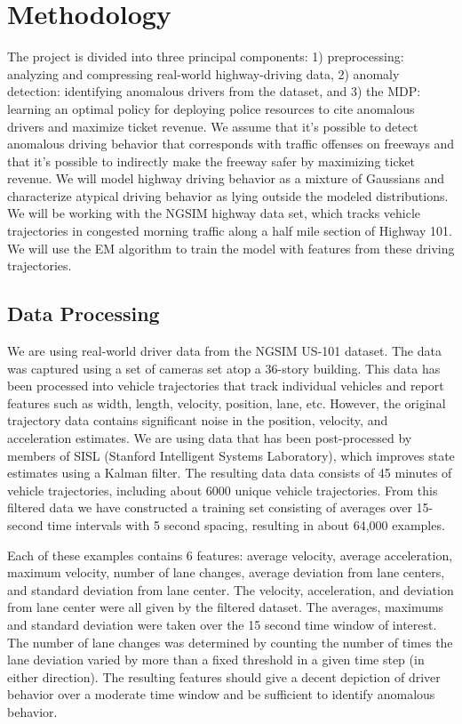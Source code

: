 \documentclass[10pt,journal]{IEEEtran}
\begin{document}
\section{Methodology}
The project is divided into three principal components: 1) preprocessing: analyzing and compressing real-world highway-driving data, 2) anomaly detection: identifying anomalous drivers from the dataset, and 3) the MDP: learning an optimal policy for deploying police resources to cite anomalous drivers and maximize ticket revenue. We assume that it's possible to detect anomalous driving behavior that corresponds with traffic offenses on freeways and that it's possible to indirectly make the freeway safer by maximizing ticket revenue. We will model highway driving behavior as a mixture of Gaussians and characterize atypical driving behavior as lying outside the modeled distributions. We will be working with the NGSIM highway data set, which tracks vehicle trajectories in congested morning traffic along a half mile section of Highway 101. We will use the EM algorithm to train the model with features from these driving trajectories.

\subsection*{Data Processing} \label{data}
We are using real-world driver data from the NGSIM US-101 dataset. The data was captured using a set of cameras set atop a 36-story building. This data has been processed into vehicle trajectories that track individual vehicles and report features such as width, length, velocity, position, lane, etc. However, the original trajectory data contains significant noise in the position, velocity, and acceleration estimates. We are using data that has been post-processed by members of SISL (Stanford Intelligent Systems Laboratory), which improves state estimates using a Kalman filter. The resulting data data consists of 45 minutes of vehicle trajectories, including about 6000 unique vehicle trajectories. From this filtered data we have constructed a training set consisting of averages over 15-second time intervals with 5 second spacing, resulting in about 64,000 examples. 

Each of these examples contains 6 features: average velocity, average acceleration, maximum velocity, number of lane changes, average deviation from lane centers, and standard deviation from lane center. The velocity, acceleration, and deviation from lane center were all given by the filtered dataset. The averages, maximums and standard deviation were taken over the 15 second time window of interest. The number of lane changes was determined by counting the number of times the lane deviation varied by more than a fixed threshold in a given time step (in either direction). The resulting features should give a decent depiction of driver behavior over a moderate time window and be sufficient to identify anomalous behavior. 
\end{document}

